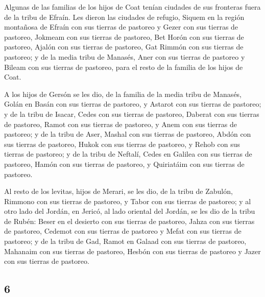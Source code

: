 \begin{paracol}{2}
 Algunas de las familias de los hijos de Coat tenían
ciudades de sus fronteras fuera de la tribu de Efraín. 
Les dieron las ciudades de refugio, Siquem en la región montañosa de
Efraín con sus tierras de pastoreo y Gezer con sus tierras de pastoreo,
 Jokmeam con sus tierras de pastoreo, Bet Horón con sus
tierras de pastoreo,  Ajalón con sus tierras de pastoreo,
Gat Rimmón con sus tierras de pastoreo;  y de la media
tribu de Manasés, Aner con sus tierras de pastoreo y Bileam con sus
tierras de pastoreo, para el resto de la familia de los hijos de Coat.

 A los hijos de Gersón se les dio, de la familia de la
media tribu de Manasés, Golán en Basán con sus tierras de pastoreo, y
Astarot con sus tierras de pastoreo;  y de la tribu de
Isacar, Cedes con sus tierras de pastoreo, Daberat con sus tierras de
pastoreo,  Ramot con sus tierras de pastoreo, y Anem con
sus tierras de pastoreo;  y de la tribu de Aser, Mashal
con sus tierras de pastoreo, Abdón con sus tierras de pastoreo,
 Hukok con sus tierras de pastoreo, y Rehob con sus
tierras de pastoreo;  y de la tribu de Neftalí, Cedes en
Galilea con sus tierras de pastoreo, Hamón con sus tierras de pastoreo,
y Quiriatáim con sus tierras de pastoreo.

 Al resto de los levitas, hijos de Merari, se les dio, de
la tribu de Zabulón, Rimmono con sus tierras de pastoreo, y Tabor con
sus tierras de pastoreo;  y al otro lado del Jordán, en
Jericó, al lado oriental del Jordán, se les dio de la tribu de Rubén:
Beser en el desierto con sus tierras de pastoreo, Jahza con sus tierras
de pastoreo,  Cedemot con sus tierras de pastoreo y Mefat
con sus tierras de pastoreo;  y de la tribu de Gad, Ramot
en Galaad con sus tierras de pastoreo, Mahanaim con sus tierras de
pastoreo,  Hesbón con sus tierras de pastoreo y Jazer con
sus tierras de pastoreo.

\switchcolumn
\begin{otherlanguage}{english}

\hypertarget{section-11}{%
\section{6}\label{section-11}}


\end{otherlanguage}
\end{paracol}
